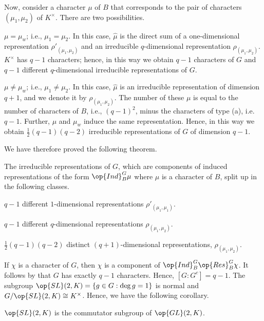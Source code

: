 \documentclass[../main.tex]{subfiles}
\begin{document}
Now, consider a character $\mu$ of $B$ that corresponds to the pair of characters $(\mu_1,\mu_2)$ of $K^\times$. There are two possibilities.
\begin{listalph}
	\item $\mu=\mu_w$; i.e., $\mu_1=\mu_2$. In this case, $\widehat\mu$ is the direct sum of a one-dimensional representation $\rho'_{(\mu_1,\mu_2)}$ and an irreducible $q$-dimensional representation $\rho_{(\mu_1,\mu_2)}$. $K^\times$ has $q-1$ characters; hence, in this way we obtain $q-1$ characters of $G$ and $q-1$ different $q$-dimensional irreducible representations of $G$.
	\item $\mu\ne\mu_w$; i.e., $\mu_1\ne\mu_2$. In this case, $\widehat\mu$ is an irreducible representation of dimension $q+1$, and we denote it by $\rho_{(\mu_1,\mu_2)}$. The number of these $\mu$ is equal to the number of characters of $B$, i.e., $(q-1)^2$, minus the characters of type (a), i.e. $q-1$. Further, $\mu$ and $\mu_w$ induce the same representation. Hence, in this way we obtain $\frac12(q-1)(q-2)$ irreducible representations of $G$ of dimension $q-1$.
\end{listalph}
We have therefore proved the following theorem.
\begin{theorem} \label{thm:non-cusp-reps}
	The irreducible representations of $G$, which are components of induced representations of the form $\op{Ind}^G_B\mu$ where $\mu$ is a character of $B$, split up in the following classes.
	\begin{listalph}
		\item $q-1$ different $1$-dimensional representations $\rho'_{(\mu_1,\mu_1)}$.
		\item $q-1$ different $q$-dimensional representations $\rho_{(\mu_1,\mu_2)}$.
		\item $\frac12(q-1)(q-2)$ distinct $(q+1)$-dimensional representations, $\rho_{(\mu_1,\mu_2)}$.
	\end{listalph}
\end{theorem}
If $\chi$ is a character of $G$, then $\chi$ is a component of $\op{Ind}^G_B\op{Res}^G_B\chi$. It follows by  that $G$ has exactly $q-1$ characters. Hence, $[G:G^c]=q-1$. The subgroup $\op{SL}(2,K)=\{g\in G:\deg g=1\}$ is normal and $G/\op{SL}(2,K)\cong K^\times$. Hence, we have the following corollary.
\begin{corollary}
	$\op{SL}(2,K)$ is the commutator subgroup of $\op{GL}(2,K)$.
\end{corollary}
\end{document}
